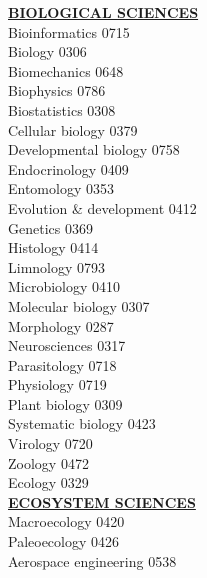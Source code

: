 \documentclass[9pt]{article}
\newcommand{\categoryheading}[1]{{\fontsize{8}{11}\selectfont \textbf{\uline{#1}}}}
\begin{document}
\begin{multicols}{3}
\categoryheading{BIOLOGICAL SCIENCES} \leavevmode \\
Bioinformatics \hfill 0715 \leavevmode \\
Biology \hfill 0306 \leavevmode \\
Biomechanics \hfill 0648 \leavevmode \\
Biophysics \hfill 0786 \leavevmode \\
Biostatistics \hfill 0308 \leavevmode \\
Cellular biology \hfill 0379 \leavevmode \\
Developmental biology \hfill 0758 \leavevmode \\
Endocrinology \hfill 0409 \leavevmode \\
Entomology \hfill 0353 \leavevmode \\
Evolution \& development \hfill 0412 \leavevmode \\
Genetics \hfill 0369 \leavevmode \\
Histology \hfill 0414 \leavevmode \\
Limnology \hfill 0793 \leavevmode \\
Microbiology \hfill 0410 \leavevmode \\
Molecular biology \hfill 0307 \leavevmode \\
Morphology \hfill 0287 \leavevmode \\
Neurosciences \hfill 0317 \leavevmode \\
Parasitology \hfill 0718 \leavevmode \\
Physiology \hfill 0719 \leavevmode \\
Plant biology \hfill 0309 \leavevmode \\
Systematic biology \hfill 0423 \leavevmode \\
Virology \hfill 0720 \leavevmode \\
Zoology \hfill 0472 \leavevmode \\
Ecology \hfill 0329 \leavevmode \\
\columnbreak
\categoryheading{ECOSYSTEM SCIENCES} \leavevmode \\
Macroecology \hfill 0420 \leavevmode \\
Paleoecology \hfill 0426 \leavevmode \\
Aerospace engineering \hfill 0538


\end{multicols}
\end{document}
